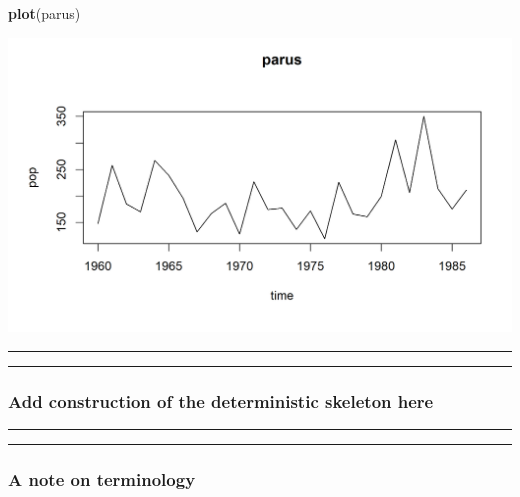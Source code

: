 \documentclass[]{article}
\newenvironment{Shaded}{\begin{snugshade}}{\end{snugshade}}
\newcommand{\KeywordTok}[1]{\textcolor[rgb]{0.13,0.29,0.53}{\textbf{#1}}}
\newcommand{\NormalTok}[1]{#1}
\begin{document}
\begin{Shaded}
\begin{Highlighting}[]
\KeywordTok{plot}\NormalTok{(parus)}
\end{Highlighting}
\end{Shaded}

\begin{center}\includegraphics{figure/intro-parus-plot1-1} \end{center}

\begin{center}\rule{0.5\linewidth}{\linethickness}\end{center}

\begin{center}\rule{0.5\linewidth}{\linethickness}\end{center}

\subsubsection{Add construction of the deterministic skeleton
here}\label{add-construction-of-the-deterministic-skeleton-here}


\begin{center}\rule{0.5\linewidth}{\linethickness}\end{center}

\begin{center}\rule{0.5\linewidth}{\linethickness}\end{center}

\subsubsection{A note on terminology}\label{a-note-on-terminology}
\end{document}
